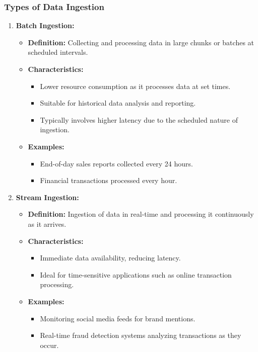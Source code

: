 \documentclass{beamer}
\begin{document}
\begin{frame}[fragile]
    \frametitle{Types of Data Ingestion}
    \begin{enumerate}
        \item \textbf{Batch Ingestion:}
        \begin{itemize}
            \item \textbf{Definition:} Collecting and processing data in large chunks or batches at scheduled intervals.
            \item \textbf{Characteristics:}
            \begin{itemize}
                \item Lower resource consumption as it processes data at set times.
                \item Suitable for historical data analysis and reporting.
                \item Typically involves higher latency due to the scheduled nature of ingestion.
            \end{itemize}
            \item \textbf{Examples:}
            \begin{itemize}
                \item End-of-day sales reports collected every 24 hours.
                \item Financial transactions processed every hour.
            \end{itemize}
        \end{itemize}
        
        \item \textbf{Stream Ingestion:}
        \begin{itemize}
            \item \textbf{Definition:} Ingestion of data in real-time and processing it continuously as it arrives.
            \item \textbf{Characteristics:}
            \begin{itemize}
                \item Immediate data availability, reducing latency.
                \item Ideal for time-sensitive applications such as online transaction processing.
            \end{itemize}
            \item \textbf{Examples:}
            \begin{itemize}
                \item Monitoring social media feeds for brand mentions.
                \item Real-time fraud detection systems analyzing transactions as they occur.
            \end{itemize}
        \end{itemize}        
    \end{enumerate}
\end{frame}
\end{document}

